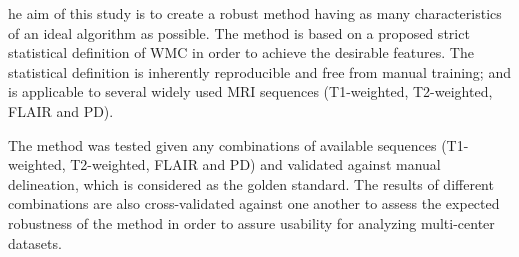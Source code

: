 he aim of this study is to create a robust method having as many characteristics of an ideal algorithm as possible. The method is based on a proposed strict statistical definition of WMC in order to achieve the desirable features. The statistical definition is inherently reproducible and free from manual training; and is applicable to several widely used MRI sequences (T1-weighted, T2-weighted, FLAIR and PD).

The method was tested given any combinations of available sequences (T1-weighted, T2-weighted, FLAIR and PD) and validated against manual delineation, which is considered as the golden standard. The results of different combinations are also cross-validated against one another to assess the expected robustness of the method in order to assure usability for analyzing multi-center datasets.
    
    
  
  
  
  
  
  
  
  
  
  
  
  
  
  
  
  
  
  
  
  
  
  